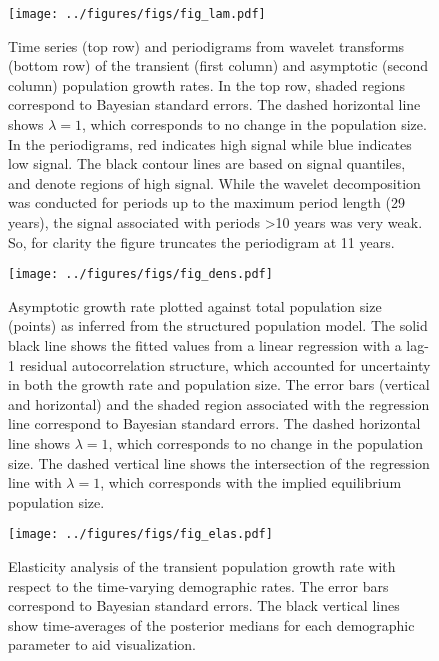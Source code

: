 \documentclass[11pt]{article}
\begin{document}
{%
\clearpage
\begin{figure}
\centering
\texttt{[image: ../figures/figs/fig\_lam.pdf]}
\caption{\label{fig:lam}
Time series (top row) and periodigrams from wavelet transforms (bottom row) 
of the transient (first column) and asymptotic (second column) population growth rates.
In the top row, shaded regions correspond to Bayesian standard errors.
The dashed horizontal line shows $\lambda=1$, 
which corresponds to no change in the population size.
In the periodigrams, red indicates high signal while blue indicates low signal. 
The black contour lines are based on signal quantiles, and denote regions of high signal.
While the wavelet decomposition was conducted for periods up to the maximum period length
(29 years), the signal associated with periods >10 years was very weak. 
So, for clarity the figure truncates the periodigram at 11 years.
}
\end{figure}
\clearpage

\clearpage
\begin{figure}
\centering
\texttt{[image: ../figures/figs/fig\_dens.pdf]}
\caption{\label{fig:dens}
Asymptotic growth rate plotted against total population size (points) as 
inferred from the structured population model.
The solid black line shows the fitted values from a linear regression with a lag-1
residual autocorrelation structure, 
which accounted for uncertainty in both the growth rate and population size.
The error bars (vertical and horizontal)
and the shaded region associated with the regression line 
correspond to Bayesian standard errors.
The dashed horizontal line shows $\lambda=1$, 
which corresponds to no change in the population size.
The dashed vertical line shows the intersection of the regression line with $\lambda=1$,
which corresponds with the implied equilibrium population size.
}
\end{figure}
\clearpage

\clearpage
\begin{figure}
\centering
\texttt{[image: ../figures/figs/fig\_elas.pdf]}
\caption{\label{fig:elas}
Elasticity analysis of the transient population growth rate 
with respect to the time-varying demographic rates.
The error bars correspond to Bayesian standard errors.
The black vertical lines show time-averages of the posterior medians 
for each demographic parameter to aid visualization.
}
\end{figure}
\clearpage

}
\end{document}
